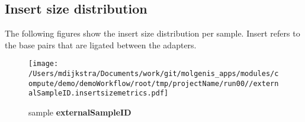 \documentclass[a4paper,12pt]{article}
\begin{document}
\clearpage
\subsection*{Insert size distribution}
The following figures show the insert size distribution per sample. Insert refers to the base pairs that are ligated between the adapters.
\begin{figure}[ht]\begin{minipage}{0.5\linewidth}\caption{sample \textbf{externalSampleID}}\centering\texttt{[image: /Users/mdijkstra/Documents/work/git/molgenis\_apps/modules/compute/demo/demoWorkflow/root/tmp/projectName/run00//externalSampleID.insertsizemetrics.pdf]}\end{minipage}\hspace{1cm}\end{figure}



%
%
%
\end{document}
